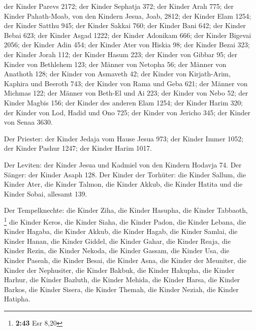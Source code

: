  der Kinder Parevs 2172;  der Kinder Sephatja
372;  der Kinder Arah 775;  der Kinder
Pahath-Moab, von den Kindern Jesua, Joab, 2812;  der Kinder
Elam 1254;  der Kinder Satthu 945;  der Kinder
Sakkai 760;  der Kinder Bani 642;  der Kinder
Bebai 623;  der Kinder Asgad 1222;  der Kinder
Adonikam 666;  der Kinder Bigevai 2056;  der
Kinder Adin 454;  der Kinder Ater von Hiskia 98;
 der Kinder Bezai 323;  der Kinder Jorah 112;
 der Kinder Hasum 223;  der Kinder von Gibbar
95;  der Kinder von Bethlehem 123;  der Männer
von Netopha 56;  der Männer von Anathoth 128; 
der Kinder von Asmaveth 42;  der Kinder von Kirjath-Arim,
Kaphira und Beeroth 743;  der Kinder von Rama und Geba 621;
 der Männer von Michmas 122;  der Männer von
Beth-El und Ai 223;  der Kinder von Nebo 52; 
der Kinder Magbis 156;  der Kinder des anderen Elam 1254;
 der Kinder Harim 320;  der Kinder von Lod,
Hadid und Ono 725;  der Kinder von Jericho 345;
 der Kinder von Senaa 3630.

 Der Priester: der Kinder Jedaja vom Hause Jesua 973;
 der Kinder Immer 1052;  der Kinder Pashur
1247;  der Kinder Harim 1017.

 Der Leviten: der Kinder Jesua und Kadmiel von den Kindern
Hodavja 74.  Der Sänger: der Kinder Asaph 128.
 Der Kinder der Torhüter: die Kinder Sallum, die Kinder
Ater, die Kinder Talmon, die Kinder Akkub, die Kinder Hatita und die
Kinder Sobai, allesamt 139.

 Der Tempelknechte: die Kinder Ziha, die Kinder Hasupha,
die Kinder Tabbaoth, \footnote{\textbf{2:43} Esr 8,20}  die
Kinder Keros, die Kinder Siaha, die Kinder Padon,  die
Kinder Lebana, die Kinder Hagaba, die Kinder Akkub,  die
Kinder Hagab, die Kinder Samlai, die Kinder Hanan,  die
Kinder Giddel, die Kinder Gahar, die Kinder Reaja,  die
Kinder Rezin, die Kinder Nekoda, die Kinder Gassam,  die
Kinder Usa, die Kinder Paseah, die Kinder Besai,  die
Kinder Asna, die Kinder der Meuniter, die Kinder der Nephusiter,
 die Kinder Bakbuk, die Kinder Hakupha, die Kinder Harhur,
 die Kinder Bazluth, die Kinder Mehida, die Kinder Harsa,
 die Kinder Barkos, die Kinder Sisera, die Kinder Themah,
 die Kinder Neziah, die Kinder Hatipha.

